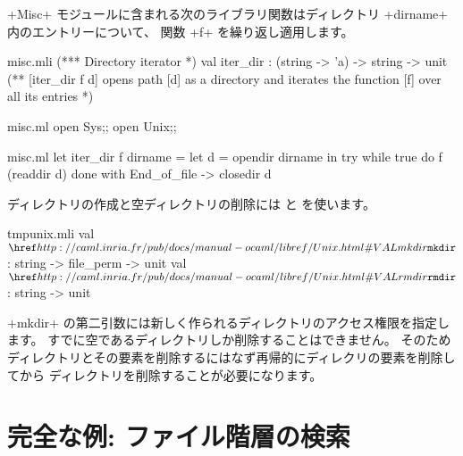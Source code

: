 \begin{example}
\ml+Misc+ モジュールに含まれる次のライブラリ関数はディレクトリ \ml+dirname+ 内のエントリーについて、
関数 \ml+f+ を繰り返し適用します。
%
\begin{codefile}{misc.mli}
(*** Directory iterator *)
val iter_dir : (string -> 'a) -> string -> unit
(** [iter_dir f d] opens path [d] as a directory and iterates the
function [f] over all its entries *)
\end{codefile}
%
\begin{codefile}{misc.ml}
open Sys;;
open Unix;;
\end{codefile}
%
\begin{listingcodefile}{misc.ml}
let iter_dir f dirname =
  let d = opendir dirname in
  try while true do f (readdir d) done
  with End_of_file -> closedir d
\end{listingcodefile}
\end{example}

ディレクトリの作成と空ディレクトリの削除には  と  を使います。
%
\begin{listingcodefile}{tmpunix.mli}
val $\libvalue{Unix}{mkdir}$ : string -> file_perm -> unit
val $\libvalue{Unix}{rmdir}$ : string -> unit
\end{listingcodefile}
%
\ml+mkdir+ の第二引数には新しく作られるディレクトリのアクセス権限を指定します。
すでに空であるディレクトリしか削除することはできません。
そのためディレクトリとその要素を削除するにはなず再帰的にディレクリの要素を削除してから
ディレクトリを削除することが必要になります。

\section{\label{ex/find}完全な例: ファイル階層の検索}

